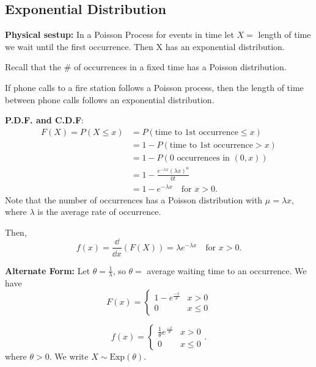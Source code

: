 \subsection{Exponential Distribution}

\textbf{Physical sestup:} In a Poisson Process for events in time let $X = $ length of time we wait until the first
occurrence. Then X has an exponential distribution.

\begin{note}
    Recall that the $\#$ of occurrences in a fixed time has a Poisson distribution.
\end{note}

\begin{example}
    If phone calls to a fire station follows a Poisson process, then the length of time between phone calls follows an exponential distribution.
\end{example}


\textbf{P.D.F. and C.D.F}:
\begin{align*}
    F(X) = P(X \leq x) &= P(\text{time to 1st occurrence} \leq x) \\
    &= 1 - P(\text{time to 1st occurrence} > x) \\
    &= 1 - P(\text{0 occurrences in $(0,x)$}) \\
    &= 1 - \frac{e^{-\lambda x}(\lambda x)^0}{0!} \\
    &= 1 - e^{-\lambda x} \quad \text{for $x > 0$}.
\end{align*}
Note that the number of occurrences has a Poisson distribution with $\mu = \lambda x$, where $\lambda$ is the average rate of occurrence.

Then,
\[
    f(x) = \frac{\dd}{\dd{x}} \left( F(X) \right) = \lambda e^{-\lambda x} \quad \text{for $x > 0$}.
\]


\textbf{Alternate Form:} Let $\theta = \frac{1}{\lambda}$, so $\theta = $ average waiting time to an occurrence. 
We have
\[
    F(x) = 
    \begin{cases} 
    1 - e^{\frac{-x}{\theta}} & x > 0 \\
    0 & x \leq 0
    \end{cases}
\]

\[
    f(x) = 
    \begin{cases} 
    \frac{1}{\theta} e^{\frac{-x}{\theta}} & x > 0 \\
    0 & x \leq 0
    \end{cases}.
\]
where $\theta > 0$. We write $X \sim \text{Exp}(\theta)$. 

